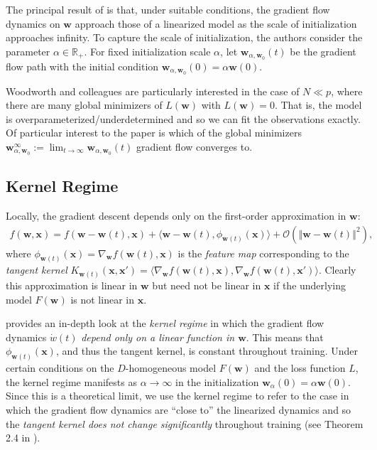 \documentclass{article}
\begin{document}
The principal result of \cite{chizat2018lazy} is that, under suitable conditions, the gradient flow dynamics on $\boldsymbol{w}$ approach those of a linearized model as the scale of initialization approaches infinity. To capture the scale of initialization, the authors consider the parameter $\alpha \in \mathbb{R}_+$. For fixed initialization scale $\alpha$, let $\boldsymbol{w}_{\alpha, \boldsymbol{w}_0}(t)$ be the gradient flow path with the initial condition $\boldsymbol{w}_{\alpha, \boldsymbol{w}_0}(0) = \alpha \boldsymbol{w}(0)$.

Woodworth and colleagues are particularly interested in the case of  $N \ll p$, where there are many global minimizers of $L(\boldsymbol{w})$ with $L(\boldsymbol{w}) = 0$. That is, the model is overparameterized/underdetermined and so we can fit the observations exactly. Of particular interest to the paper is which of the global minimizers $\boldsymbol{w}_{\alpha, \boldsymbol{w}_0}^{\infty} := \lim_{t \rightarrow \infty} \boldsymbol{w}_{\alpha, \boldsymbol{w}_0}(t)$ gradient flow converges to. 

\subsection{Kernel Regime}
Locally, the gradient descent depends only on the first-order approximation in $\boldsymbol{w}$:
\begin{align*}
    f(\boldsymbol{w}, \boldsymbol{x}) = f(\boldsymbol{w} - \boldsymbol{w}(t), \boldsymbol{x}) + \langle \boldsymbol{w} - \boldsymbol{w}(t), \phi_{\boldsymbol{w}(t)}(\boldsymbol{x}) \rangle + \mathcal{O}( \left\Vert \boldsymbol{w} - \boldsymbol{w}(t) \right\Vert^2),
\end{align*}
where $\phi_{\boldsymbol{w}(t)}(\boldsymbol{x}) = \nabla_{\boldsymbol{w}} f(\boldsymbol{w}(t), \boldsymbol{x})$ is the \textit{feature map} corresponding to the \textit{tangent kernel} $K_{\boldsymbol{w}(t)}(\boldsymbol{x}, \boldsymbol{x}') = \langle \nabla_{\boldsymbol{w}} f(\boldsymbol{w}(t), \boldsymbol{x}), \nabla_{\boldsymbol{w}} f(\boldsymbol{w}(t), \boldsymbol{x}')\rangle$. Clearly this approximation is linear in $\boldsymbol{w}$ but need not be linear in $\boldsymbol{x}$ if the underlying model $F(\boldsymbol{w})$ is not linear in $\boldsymbol{x}$.

\cite{chizat2018lazy} provides an in-depth look at the \textit{kernel regime} in which the gradient flow dynamics $\dot{w}(t)$ \textit{depend only on a linear function in $\boldsymbol{w}$}. This means that $\phi_{\boldsymbol{w}(t)}(\boldsymbol{x})$, and thus the tangent kernel, is constant throughout training. Under certain conditions on the $D$-homogeneous model $F(\boldsymbol{w})$ and the loss function $L$, the kernel regime manifests as $\alpha \rightarrow \infty$ in the initialization $\boldsymbol{w}_{\alpha}(0) = \alpha \boldsymbol{w}(0)$. Since this is a theoretical limit, we use the kernel regime to refer to the case in which the gradient flow dynamics are \enquote{close to} the linearized dynamics and so the \textit{tangent kernel does not change significantly} throughout training (see Theorem 2.4 in \cite{chizat2018lazy}).
\end{document}
